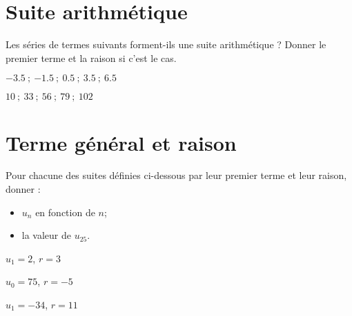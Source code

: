	\section{Suite arithmétique}
Les séries de termes suivants forment-ils une suite arithmétique ? Donner le premier terme et la raison si c'est le cas.
\begin{questions}
	
	
	\question[2] $\num{-3.5} \: ; \: \num{-1.5} \: ; \: \num{0.5}  \: ; \:  \num{3.5} \: ; \: \num{6.5}$ 
	\fillwithdottedlines{3cm}
	
	\question[2] $\num{10} \: ; \:  \num{33} \: ; \: \num{56} \: ; \: \num{79} \: ; \: \num{102}$ 
	\fillwithdottedlines{3cm}
	
\end{questions}


\section{Terme général et raison}

Pour chacune des suites définies ci-dessous par leur premier terme et leur raison, donner :
\begin{itemize}
	\item $u_n$ en fonction de $n$;
	\item la valeur de $u_{25}$.
\end{itemize} 
\begin{questions}
	
	
	\question[2] $u_1 = 2$, $r= 3$
	
	\fillwithdottedlines{6cm}
	
	\question[2] $u_0 = 75$, $r= -5$
	
	\fillwithdottedlines{6cm}
	
	\question[2] $u_1 = -34$, $r=11$
	
	\fillwithdottedlines{6cm}
\end{questions}

